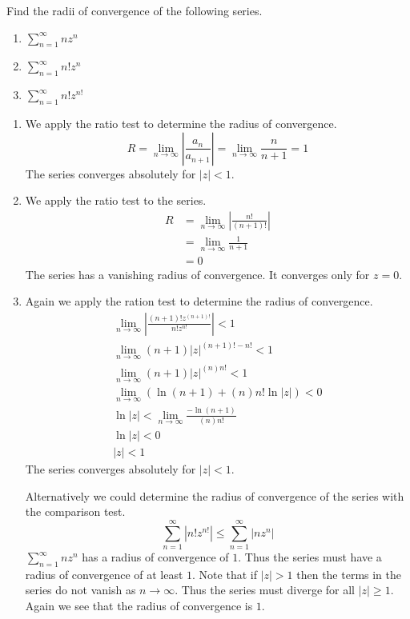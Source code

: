\begin{Example}
  Find the radii of convergence of the following series.
  \begin{enumerate}
  \item 
    $\displaystyle \sum_{n = 1}^\infty n z^n$
  \item 
    $\displaystyle \sum_{n = 1}^\infty n! z^n$
  \item 
    $\displaystyle \sum_{n = 1}^\infty n! z^{n!}$
  \end{enumerate}

  \begin{enumerate}
  \item
    We apply the ratio test to determine the radius of convergence.
    \[
    R = \lim_{n \to \infty} \left| \frac{a_n}{a_{n+1}} \right| = \lim_{n \to \infty} \frac{n}{n + 1} = 1
    \]
    The series converges absolutely for $|z| < 1$.
  \item
    We apply the ratio test to the series.
    \begin{align*}
      R
      &= \lim_{n \to \infty} \left| \frac{n!}{(n+1)!} \right| 
      \\
      &= \lim_{n \to \infty} \frac{1}{n + 1} 
      \\
      &= 0
    \end{align*}
    The series has a vanishing radius of convergence. 
    It converges only for $z = 0$.
  \item
    Again we apply the ration test to determine the radius of convergence.
    \begin{gather*}
      \lim_{n \to \infty} \left| \frac{(n+1)! z^{(n+1)!}}{n! z^{n!}} \right| < 1 
      \\
      \lim_{n \to \infty} (n+1) |z|^{(n+1)! - n!} < 1 
      \\
      \lim_{n \to \infty} (n+1) |z|^{(n)n!} < 1 
      \\
      \lim_{n \to \infty} \left( \ln(n+1) + (n) n! \ln|z| \right) < 0 
      \\
      \ln |z| < \lim_{n \to \infty} \frac{- \ln(n + 1)}{(n) n!} 
      \\
      \ln |z| < 0 
      \\
      |z| < 1
    \end{gather*}
    The series converges absolutely for $|z| < 1$.

    Alternatively we could determine the radius of convergence of the
    series with the comparison test.
    \[
    \sum_{n = 1}^\infty \left| n! z^{n!} \right| \leq \sum_{n = 1}^\infty \left| n z^n \right|
    \]
    $\sum_{n = 1}^\infty n z^n$ has a radius of convergence of $1$.  Thus
    the series must have a radius of convergence of at least $1$.
    Note that if $|z| > 1$ then the terms in the series do not vanish
    as $n \to \infty$.  Thus the series must diverge for all $|z| \geq 1$.
    Again we see that the radius of convergence is $1$.
  \end{enumerate}
\end{Example}











